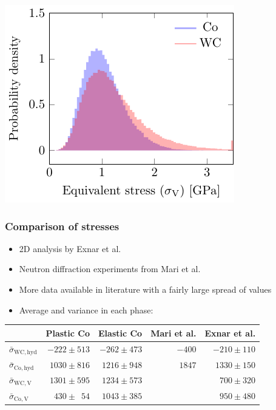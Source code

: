\documentclass[11pt]{beamer} %
\newcommand{\Co}{\mathrm{Co}}
\newcommand{\WC}{\mathrm{WC}}
\newcommand{\hyd}{\mathrm{hyd}}
\newcommand{\eq}{\mathrm{V}}
\begin{document}
\begin{frame}
\begin{itemize}
{\includegraphics[scale=0.7]{WCResidualStress-figure6}
}
  \end{itemize}
\end{frame}

\begin{frame}
 \frametitle{Comparison of stresses}
  \begin{itemize}
  \item 2D analysis by Exnar et al.
  \item Neutron diffraction experiments from Mari et al. 
  \item More data available in literature with a fairly large spread of values
  \item Average and variance in each phase:
 \end{itemize}
\begin{center}
\begin{tabular}{l|r|r||r|r}
                           & Plastic Co & Elastic Co & Mari et al. & Exnar et al.\\
                           \midrule
 $\bar{\sigma}_{\WC,\hyd}$ & $ -222 \pm 513 $          & $ -262 \pm 473 $ & $ -400 $ & $ -210\pm110 $\\
 $\bar{\sigma}_{\Co,\hyd}$ & $ 1030 \pm 816 $          & $ 1216 \pm 948 $ & $ 1847 $ & $ 1330\pm150 $\\
 $\bar{\sigma}_{\WC,\eq}$  & $ 1301 \pm 595 $          & $ 1234 \pm 573 $ &          & $  700\pm320 $\\
 $\bar{\sigma}_{\Co,\eq}$  & $ 430 \pm \phantom{0}54 $ & $ 1043 \pm 385 $ &          & $  950\pm480 $\\
\end{tabular}
 \end{center}
\end{frame}
\end{document}
